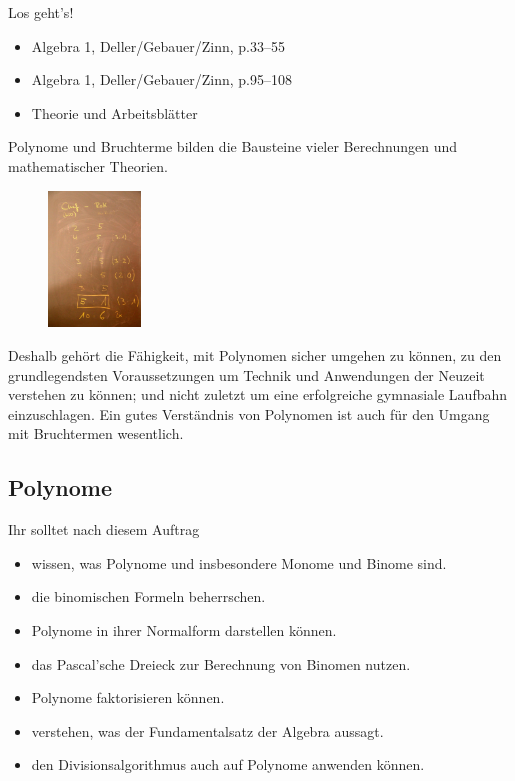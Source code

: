 \documentclass[%
11pt,%
twoside,%
titlepage,%
german,%
]{scrartcl}
\begin{document}
Los geht's!
\begin{itemize}
\item Algebra 1, Deller/Gebauer/Zinn, p.33--55
\item Algebra 1, Deller/Gebauer/Zinn, p.95--108
\item Theorie und Arbeitsblätter
\end{itemize}
Polynome und Bruchterme bilden die Bausteine vieler Berechnungen und mathematischer Theorien.
\begin{figure}
  \begin{center}
    \includegraphics[width=0.22\textwidth]{pictures/rokwidboard}
  \end{center}
\end{figure}
Deshalb gehört die Fähigkeit, mit Polynomen sicher umgehen zu können, zu den grundlegendsten Voraussetzungen um Technik und Anwendungen der Neuzeit verstehen zu können; und nicht zuletzt um eine erfolgreiche gymnasiale Laufbahn einzuschlagen. Ein gutes Verständnis von Polynomen ist auch für den Umgang mit Bruchtermen wesentlich.

\subsection{Polynome}
Ihr solltet nach diesem Auftrag

\begin{itemize}
\item wissen, was Polynome und insbesondere Monome und Binome sind.
\item die binomischen Formeln beherrschen.
\item Polynome in ihrer Normalform darstellen können.
\item das Pascal'sche Dreieck zur Berechnung von Binomen nutzen.
\item Polynome faktorisieren können.
\item verstehen, was der Fundamentalsatz der Algebra aussagt.
\item den Divisionsalgorithmus auch auf Polynome anwenden können.
\end{itemize}
\end{document}
